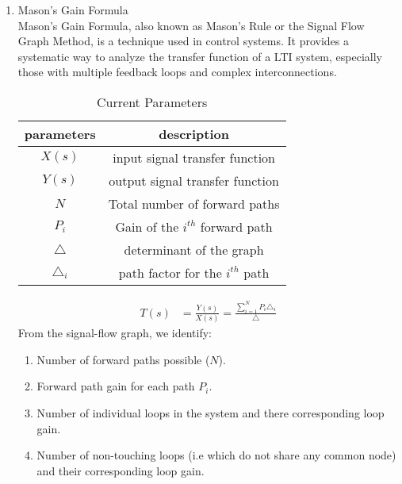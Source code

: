 \begin{enumerate}[label=\thechapter.\arabic*,ref=\thechapter.\theenumi]

\item{Mason's Gain Formula}\\

Mason’s Gain Formula, also known as Mason’s Rule or the Signal Flow Graph Method, is a technique used in control systems. It provides a systematic way to analyze the transfer function of a LTI system, especially those with multiple feedback loops and complex interconnections.

\begin{table}[!ht]
\begin{tabular}{|c|c|}
	\hline
	\textbf{parameters} & \textbf{description}\\
	\hline
	$X(s)$ & input signal transfer function\\
	\hline
	$Y(s)$ & output signal transfer function\\
	\hline
	$N$ & Total number of forward paths\\
	\hline
	$P_i$ & Gain of the $i^{th}$ forward path\\
	\hline
	$\triangle$ & determinant of the graph\\
	\hline
	$\triangle_i$ & path factor for the $i^{th}$ path\\
	\hline
\end{tabular}
\caption{Current Parameters}
\end{table}
\begin{align}
T(s) &= \frac{Y(s)}{X(s)} = \frac{\sum_{i=1}^{N}P_i\triangle_i}{\triangle}
\end{align}
From the signal-flow graph, we identify:\\
\begin{enumerate}
\item Number of forward paths possible ($N$).\\
\item Forward path gain for each path $P_{i}$.\\
\item Number of individual loops in the system and there corresponding loop gain.\\
\item Number of non-touching loops (i.e which do not share any common node) and their corresponding loop gain.
\end{enumerate}


\end{enumerate}
